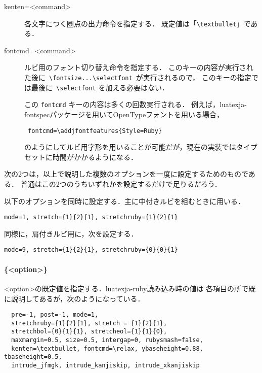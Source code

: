 \documentclass[a4paper,10ptj]{ltjsarticle}
\def\cs#1{\eghostguarded{\texttt{\textbackslash#1}}}
\begin{document}
\begin{description}
\item[kenten=<command>]各文字につく圏点の出力命令を指定する．
  既定値は「\verb+\textbullet+」である．

\item[fontcmd=<command>]ルビ用のフォント切り替え命令を指定する．
このキーの内容が実行された後に\ \verb+\fontsize...\selectfont+\ が実行されるので，
このキーの指定では最後に\ \verb+\selectfont+ を加える必要はない．

この \texttt{fontcmd} キーの内容は多くの回数実行される．
例えば，\textsf{luatexja-fontspec}パッケージを用いてOpenTypeフォントを用いる場合，
\begin{lstlisting}
 fontcmd=\addjfontfeatures{Style=Ruby}
\end{lstlisting}
のようにしてルビ用字形を用いることが可能だが，現在の実装ではタイプセットに時間がかかるようになる．


\end{description}

\medskip
次の2つは，以上で説明した複数のオプションを一度に設定するためのものである．
普通はこの2\nobreak つのうちいずれかを設定するだけで足りるだろう．

\begin{description}
\def\makelabel#1{\ttfamily\bfseries #1}
\item[naka] 以下のオプションを同時に設定する．主に中付きルビを組むときに用いる．
\begin{verbatim}
mode=1, stretch={1}{2}{1}, stretchruby={1}{2}{1}
\end{verbatim}
\item[kata] 同様に，肩付きルビ用に，次を設定する．
\begin{verbatim}
mode=9, stretch={1}{2}{1}, stretchruby={0}{0}{1}
\end{verbatim}
\end{description}

\paragraph{\cs{ltjsetruby}\{<option>\}}
<option>の既定値を指定する．\textsf{luatexja-ruby}読み込み時の値は
各項目の所で既に説明してあるが，次のようになっている．
\begin{verbatim}
  pre=-1, post=-1, mode=1, 
  stretchruby={1}{2}{1}, stretch = {1}{2}{1},
  stretchbol={0}{1}{1}, stretcheol={1}{1}{0},
  maxmargin=0.5, size=0.5, intergap=0, rubysmash=false,
  kenten=\textbullet, fontcmd=\relax, ybaseheight=0.88, tbaseheight=0.5,
  intrude_jfmgk, intrude_kanjiskip, intrude_xkanjiskip
\end{verbatim}
\end{document}
